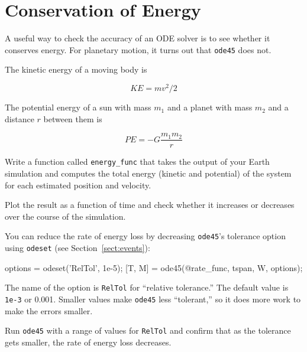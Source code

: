 \documentclass[
]{book}
\numberwithin{Answer}{chapter}
\numberwithin{Exercise}{chapter}
\begin{document}
\section{Conservation of Energy}

A useful way to check the accuracy of an ODE solver is to see whether it conserves energy.  For planetary motion, it turns out that {\tt ode45} does not.


The kinetic energy of a moving body is

\begin{equation*}
KE = m v^2 / 2
\end{equation*}

The potential energy of a sun with mass $m_1$ and a
planet with mass $m_2$ and a distance $r$ between them is

\begin{equation}
PE = -G \frac{m_1 m_2}{r}
\end{equation}

Write a function called {\tt energy\_func} that takes the output of
your Earth simulation and computes the total
energy (kinetic and potential) of the system for each estimated
position and velocity.

Plot the result as a function of time and
check whether it increases or  decreases over the course of the simulation.


You can reduce the rate of energy loss by decreasing {\tt ode45}'s
tolerance option using {\tt odeset} (see Section~\ref{sect:events}):

\begin{code}
options = odeset('RelTol', 1e-5);
[T, M] = ode45(@rate_func, tspan, W, options);
\end{code}

The name of the option is {\tt RelTol} for ``relative tolerance.''
The default value is {\tt 1e-3} or 0.001.  Smaller values
make {\tt ode45} less ``tolerant,'' so it does more work to
make the errors smaller.


Run {\tt ode45} with a range of values for {\tt RelTol} and confirm
that as the tolerance gets smaller, the rate of energy loss
decreases.

\end{document}
